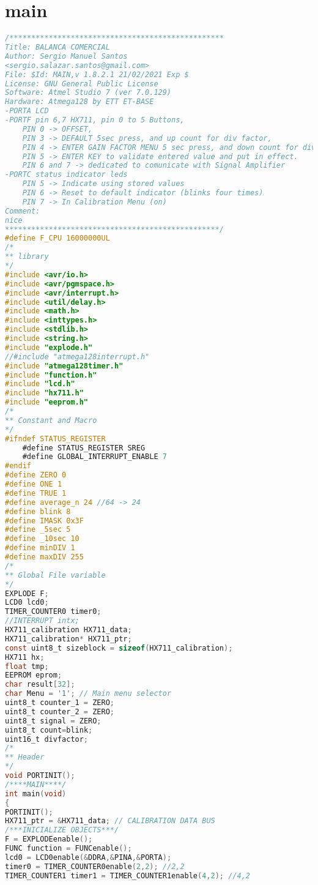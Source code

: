 \chapter{main}
\begin{lstlisting}[language=C, caption={main.c}, label=main-c, captionpos=b]
/*************************************************
Title: BALANCA COMERCIAL
Author: Sergio Manuel Santos
<sergio.salazar.santos@gmail.com>
File: $Id: MAIN,v 1.8.2.1 21/02/2021 Exp $
License: GNU General Public License
Software: Atmel Studio 7 (ver 7.0.129)
Hardware: Atmega128 by ETT ET-BASE
-PORTA LCD
-PORTF pin 6,7 HX711, pin 0 to 5 Buttons, 
	PIN 0 -> OFFSET, 
	PIN 3 -> DEFAULT 5sec press, and up count for div factor, 
	PIN 4 -> ENTER GAIN FACTOR MENU 5 sec press, and down count for div factor, 
	PIN 5 -> ENTER KEY to validate entered value and put in effect.
	PIN 6 and 7 -> dedicated to comunicate with Signal Amplifier
-PORTC status indicator leds
	PIN 5 -> Indicate using stored values
	PIN 6 -> Reset to default indicator (blinks four times)
	PIN 7 -> In Calibration Menu (on)
Comment:
nice
*************************************************/
#define F_CPU 16000000UL
/*
** library
*/
#include <avr/io.h>
#include <avr/pgmspace.h>
#include <avr/interrupt.h>
#include <util/delay.h>
#include <math.h>
#include <inttypes.h>
#include <stdlib.h>
#include <string.h>
#include "explode.h"
//#include "atmega128interrupt.h"
#include "atmega128timer.h"
#include "function.h"
#include "lcd.h"
#include "hx711.h"
#include "eeprom.h"
/*
** Constant and Macro
*/
#ifndef STATUS_REGISTER
	#define STATUS_REGISTER SREG
	#define GLOBAL_INTERRUPT_ENABLE 7
#endif
#define ZERO 0
#define ONE 1
#define TRUE 1
#define average_n 24 //64 -> 24
#define blink 8
#define IMASK 0x3F
#define _5sec 5
#define _10sec 10
#define minDIV 1
#define maxDIV 255
/*
** Global File variable
*/
EXPLODE F;
LCD0 lcd0;
TIMER_COUNTER0 timer0;
//INTERRUPT intx;
HX711_calibration HX711_data;
HX711_calibration* HX711_ptr;
const uint8_t sizeblock = sizeof(HX711_calibration);
HX711 hx;
float tmp;
EEPROM eprom;
char result[32];
char Menu = '1'; // Main menu selector
uint8_t counter_1 = ZERO;
uint8_t counter_2 = ZERO;
uint8_t signal = ZERO;
uint8_t count=blink;
uint16_t divfactor;
/*
** Header
*/
void PORTINIT();
/****MAIN****/
int main(void)
{
PORTINIT();
HX711_ptr = &HX711_data; // CALIBRATION DATA BUS
/***INICIALIZE OBJECTS***/
F = EXPLODEenable();
FUNC function = FUNCenable();
lcd0 = LCD0enable(&DDRA,&PINA,&PORTA);
timer0 = TIMER_COUNTER0enable(2,2); //2,2
TIMER_COUNTER1 timer1 = TIMER_COUNTER1enable(4,2); //4,2

\end{lstlisting}
